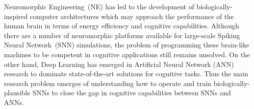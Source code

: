 Neuromorphic Engineering~(NE) has led to the development of biologically-inspired computer architectures which may approach the performance of the human brain in terms of energy efficiency and cognitive capabilities.
Although there are a number of neuromorphic platforms available for large-scale Spiking Neural Network~(SNN) simulations, the problem of programming these brain-like machines to be competent in cognitive applications still remains unsolved.
On the other hand, Deep Learning has emerged in Artificial Neural Network (ANN) research to dominate state-of-the-art solutions for cognitive tasks.
Thus the main research problem emerges of understanding how to operate and train biologically-plausible SNNs to close the gap in cognitive capabilities between SNNs and ANNs.





